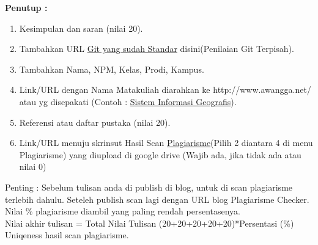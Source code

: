 \textbf{Penutup :}
\begin{enumerate}
\item Kesimpulan	dan	saran	(nilai	20).

\item Tambahkan	URL \underline{Git	yang	sudah	Standar} disini(Penilaian	Git Terpisah).

\item Tambahkan	Nama,	NPM,	Kelas,	Prodi,	Kampus.

\item Link/URL	dengan	Nama	Matakuliah	diarahkan	ke	http://www.awangga.net/	atau	yg	disepakati	(Contoh	: \underline{Sistem	Informasi	Geografis}).

\item Referensi	atau	daftar	pustaka	(nilai	20).

\item Link/URL	menuju	skrinsut	Hasil	Scan \underline{ Plagiarisme}(Pilih	2	diantara	4	di	menu	Plagiarisme) yang	diupload	di	google	drive	(Wajib	ada,	jika	tidak	ada	atau	nilai	0)

\end{enumerate}

Penting	:	Sebelum	tulisan	anda	di	publish	di	blog,	untuk	di	scan	plagiarisme	terlebih	dahulu.	Seteleh	publish	scan	lagi	dengan	URL	blog	Plagiarisme	Checker.	Nilai	\%	plagiarisme	diambil	yang	paling	rendah	persentasenya. \\
Nilai	akhir	tulisan	=	Total	Nilai	Tulisan	(20+20+20+20+20)*Persentasi	(\%)	Uniqeness	hasil	scan	
plagiarisme.

